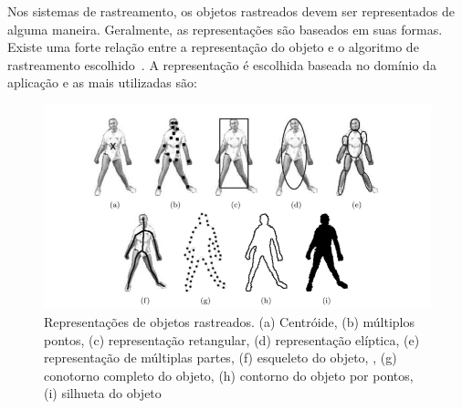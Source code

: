 	Nos sistemas de rastreamento, os objetos rastreados devem ser representados de alguma maneira. Geralmente, as representações são baseados em suas formas. Existe uma forte relação entre a representação do objeto e o algoritmo de rastreamento escolhido~\cite{yilmaz}. A representação é escolhida baseada no domínio da aplicação e as mais utilizadas são:

	\begin{figure}[hbt]
		\begin{center}
			\includegraphics[scale=0.5]{figuras/2.FundamentacaoTeorica/representacao.png}
		\end{center}
		\caption{Representações de objetos rastreados. (a) Centróide, (b) múltiplos pontos, (c) representação retangular, (d) representação elíptica, (e) representação de múltiplas partes, (f) esqueleto do objeto, , (g) conotorno completo do objeto, (h) contorno do objeto por pontos, (i) silhueta do objeto~\cite{yilmaz}}
		\label{representacao}
	\end{figure}

